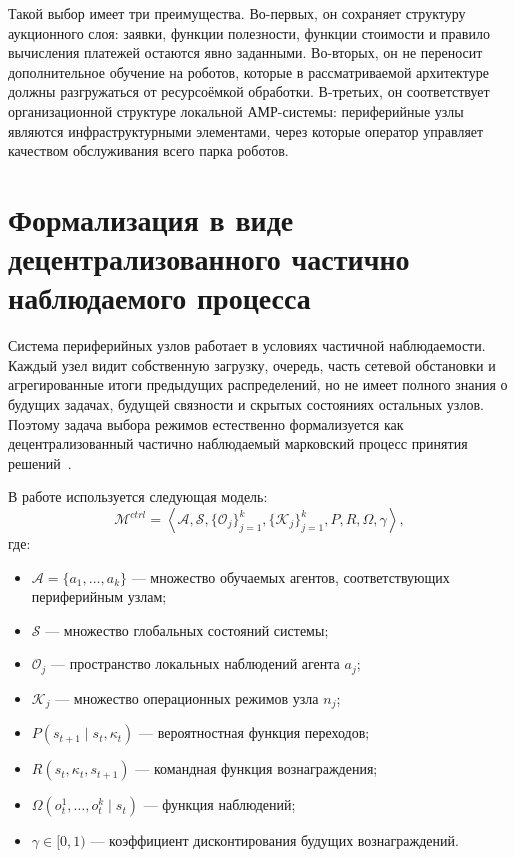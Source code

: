 Такой выбор имеет три преимущества. Во-первых, он сохраняет структуру аукционного слоя: заявки, функции полезности, функции стоимости и правило вычисления платежей остаются явно заданными. Во-вторых, он не переносит дополнительное обучение на роботов, которые в рассматриваемой архитектуре должны разгружаться от ресурсоёмкой обработки. В-третьих, он соответствует организационной структуре локальной АМР-системы: периферийные узлы являются инфраструктурными элементами, через которые оператор управляет качеством обслуживания всего парка роботов.

\section{Формализация в виде децентрализованного частично наблюдаемого процесса}

Система периферийных узлов работает в условиях частичной наблюдаемости. Каждый узел видит собственную загрузку, очередь, часть сетевой обстановки и агрегированные итоги предыдущих распределений, но не имеет полного знания о будущих задачах, будущей связности и скрытых состояниях остальных узлов. Поэтому задача выбора режимов естественно формализуется как децентрализованный частично наблюдаемый марковский процесс принятия решений~\cite{Oliehoek2016DecPOMDP,Bernstein2002Complexity}.


В работе используется следующая модель:
\begin{equation}
    \mathcal{M}^{ctrl} =
    \left\langle
        \mathcal{A},
        \mathcal{S},
        \{\mathcal{O}_j\}_{j=1}^{k},
        \{\mathcal{K}_j\}_{j=1}^{k},
        P,
        R,
        \Omega,
        \gamma
    \right\rangle ,
    \label{eq:ch4_decpomdp}
\end{equation}
где:
\begin{itemize}
    \item $\mathcal{A}=\{a_1,\ldots,a_k\}$ --- множество обучаемых агентов, соответствующих периферийным узлам;
    \item $\mathcal{S}$ --- множество глобальных состояний системы;
    \item $\mathcal{O}_j$ --- пространство локальных наблюдений агента $a_j$;
    \item $\mathcal{K}_j$ --- множество операционных режимов узла $n_j$;
    \item $P(s_{t+1}\mid s_t,\kappa_t)$ --- вероятностная функция переходов;
    \item $R(s_t,\kappa_t,s_{t+1})$ --- командная функция вознаграждения;
    \item $\Omega(o^1_t,\ldots,o^k_t\mid s_t)$ --- функция наблюдений;
    \item $\gamma\in[0,1)$ --- коэффициент дисконтирования будущих вознаграждений.
\end{itemize}


